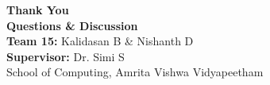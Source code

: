 \documentclass[aspectratio=169, 10pt]{beamer}
\begin{document}
\begin{frame}[plain]
  \centering
  \vspace{1.8cm}
  {\Huge \textbf{\color{NavyBlue} Thank You}}\\[12pt]
  {\large \textbf{\color{TealAccent} Questions \& Discussion}}\\[24pt]
  \textbf{Team 15:} Kalidasan B \& Nishanth D\\
  \vspace{4pt}
  \textbf{Supervisor:} Dr. Simi S\\
  \vspace{4pt}
  \small School of Computing, Amrita Vishwa Vidyapeetham
\end{frame}
\end{document}
